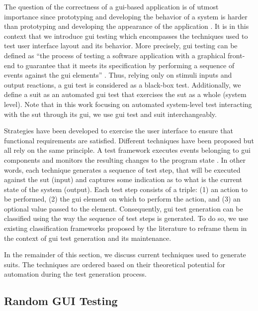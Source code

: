 The question of the correctness of a \gls{gui}-based application is of utmost importance since prototyping and developing the behavior of a system is harder than prototyping and developing the appearance of the application \cite{Myers2008}. It is in this context that we introduce \gls{gui} testing which encompasses the techniques used to test user interface layout and its behavior. More precisely, \gls{gui} testing can be defined as ``the process of testing a software application with a graphical front-end to guarantee that it meets its specification by performing a sequence of events against the \gls{gui} elements'' \cite{Cunha2010, Banerjee2013, Issa2012}. Thus, relying only on stimuli inputs and output reactions, a \gls{gui} test is considered as a black-box test. Additionally, we define a \gls{suit} as an automated \gls{gui} test that exercises the \gls{sut} as a whole (system level). Note that in this work focusing on automated system-level test interacting with the \gls{sut} through its \gls{gui}, we use \gls{gui} test and \gls{suit} interchangeably.

Strategies have been developed to exercise the user interface to ensure that functional requirements are satisfied. Different techniques have been proposed but all rely on the same principle. A test framework executes events belonging to \gls{gui} components and monitors the resulting changes to the program state \cite{Nguyen2014}. In other words, each technique generates a sequence of test step, that will be executed against the \gls{sut} (input) and captures some indication as to what is the current state of the system (output). Each test step consists of a triple: (1) an action to be performed, (2) the \gls{gui} element on which to perform the action, and (3) an optional value passed to the element. Consequently, \gls{gui} test generation can be classified using the way the sequence of test steps is generated. To do so, we use existing classification frameworks proposed by the literature \cite{Anand2013, Amalfitano2017} to reframe them in the context of \gls{gui} test generation and its maintenance.

In the remainder of this section, we discuss current techniques used to generate \gls{suit}s. The techniques are ordered based on their theoretical potential for automation during the test generation process.

\subsection{Random GUI Testing}
\label{sec:introduction-random-gui-testing}

